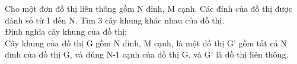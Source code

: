 Cho một đơn đồ thị liên thông gồm N đỉnh, M cạnh. Các đỉnh của đồ thị được đánh số từ 1 đến N. Tìm 3 cây khung khác nhau của đồ thị.
\\Định nghĩa cây khung của đồ thị:
\\Cây khung của đồ thị G gồm N đỉnh, M cạnh, là một đồ thị G’ gồm tất cả N đỉnh của đồ thị G, và đúng N-1 cạnh của đồ thị G, và G’ là đồ thị liên thông.